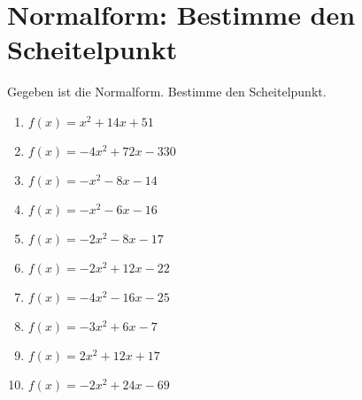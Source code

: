 \documentclass{article}%
\begin{document}
\section{Normalform: Bestimme den Scheitelpunkt}%
\label{sec:NormalformBestimmedenScheitelpunkt}%
Gegeben ist die Normalform. Bestimme den Scheitelpunkt.%
\begin{enumerate}[label=\alph*)]%
\item%
\newline\vspace{0.5cm} $f(x)=x^2 + 14x + 51$%
\item%
\newline\vspace{0.5cm} $f(x)=-4x^2 + 72x - 330$%
\item%
\newline\vspace{0.5cm} $f(x)=-x^2 - 8x - 14$%
\item%
\newline\vspace{0.5cm} $f(x)=-x^2 - 6x - 16$%
\item%
\newline\vspace{0.5cm} $f(x)=-2x^2 - 8x - 17$%
\item%
\newline\vspace{0.5cm} $f(x)=-2x^2 + 12x - 22$%
\item%
\newline\vspace{0.5cm} $f(x)=-4x^2 - 16x - 25$%
\item%
\newline\vspace{0.5cm} $f(x)=-3x^2 + 6x - 7$%
\item%
\newline\vspace{0.5cm} $f(x)=2x^2 + 12x + 17$%
\item%
\newline\vspace{0.5cm} $f(x)=-2x^2 + 24x - 69$%
\end{enumerate}

%
\end{document}
